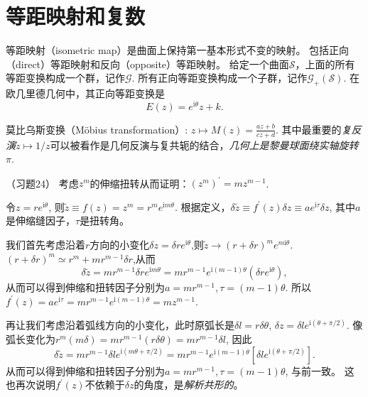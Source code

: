 \documentclass{article}
\begin{document}
\section{等距映射和复数}

等距映射（isometric map）是曲面上保持第一基本形式不变的映射。
包括正向（direct）等距映射和反向（opposite）等距映射。
给定一个曲面$\mathcal{S}$，上面的所有等距变换构成一个群，记作$\mathcal{G}$.
所有正向等距变换构成一个子群，记作$\mathcal{G}_{+}(\mathcal{S})$.
在欧几里德几何中，其正向等距变换是
\begin{equation*}
    E(z)=e^{\text{i}\theta}z+k.
\end{equation*}

莫比乌斯变换（Möbius transformation）: $z\mapsto M(z)=\frac{az+b}{cz+d}$.
其中最重要的\emph{复反演}$z\mapsto 1/z$可以被看作是几何反演与复共轭的结合，\emph{几何上是黎曼球面绕实轴旋转$\pi$}.

（习题24）
考虑$z^{m}$的伸缩扭转从而证明：$(z^{m})^{\prime}=mz^{m-1}$.

令$z=re^{\mathrm{i}\theta}$, 则$\tilde{z}\equiv f(z)=z^{m}=r^{m}e^{\mathrm{i}m\theta}$.
根据定义，$\delta\tilde{z}\equiv f^{\prime}(z)\delta{z}\equiv ae^{\mathrm{i}\tau}\delta{z}$, 其中$a$是伸缩缝因子，$\tau$是扭转角。

我们首先考虑沿着$r$方向的小变化$\delta{z}=\delta{r}e^{\mathrm{i}\theta}$,则$\tilde{z}\rightarrow(r+\delta{r})^{m}e^{m\mathrm{i}\theta}$.
$(r+\delta{r})^{m}\simeq r^{m}+mr^{m-1}\delta{r}$,从而
\begin{equation*}
\delta\tilde{z}=mr^{m-1}\delta{r}e^{\mathrm{i}m\theta}=mr^{m-1}e^{\mathrm{i}(m-1)\theta}\left(\delta{r}e^{\mathrm{i}\theta}\right),
\end{equation*}
从而可以得到伸缩和扭转因子分别为$a=mr^{m-1},\tau=(m-1)\theta$.
所以$f^{\prime}(z)=ae^{\mathrm{i}\tau}=mr^{m-1}e^{\mathrm{i}(m-1)\theta}=mz^{m-1}$.

再让我们考虑沿着弧线方向的小变化，此时原弧长是$\delta{l}=r\delta\theta$,
$\delta{z}=\delta{l}e^{\mathrm{i}(\theta+\pi/2)}$.
像弧长变化为$r^{m}(m\delta)=mr^{m-1}(r\delta\theta)=mr^{m-1}\delta{l}$, 因此
\begin{equation*}
\delta\tilde{z}=mr^{m-1}\delta{l}e^{\mathrm{i}(m\theta+\pi/2)}=mr^{m-1}e^{\mathrm{i}(m-1)\theta}\left[\delta{l}e^{\mathrm{i}(\theta+\pi/2)}\right].
\end{equation*}
从而可以得到伸缩和扭转因子分别为$a=mr^{m-1},\tau=(m-1)\theta$, 与前一致。
这也再次说明$f^{\prime}(z)$不依赖于$\delta{z}$的角度，是\emph{解析共形的}。
\end{document}
